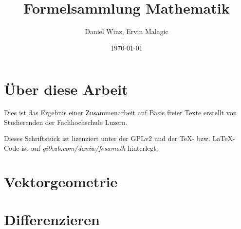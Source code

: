 \documentclass[a5paper,10pt,fleqn]{book}
\title{Formelsammlung Mathematik}
\author{Daniel Winz, Ervin Malagic}
\date{\today}
\begin{document}
\maketitle

\chapter*{Über diese Arbeit}
Dies ist das Ergebnis einer Zusammenarbeit auf Basis freier Texte erstellt von Studierenden der Fachhochschule Luzern. 

Dieses Schriftstück ist lizenziert unter der GPLv2 und der \TeX-  bzw. \LaTeX- Code ist auf \textit{github.com/daniw/fosamath} hinterlegt.


\tableofcontents

\chapter{Vektorgeometrie}


\chapter{Differenzieren}


 
\end{document}
